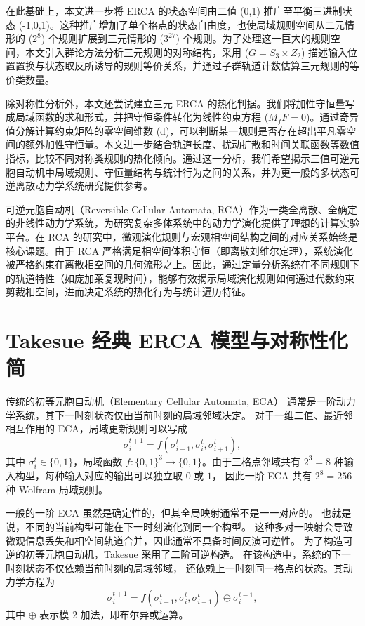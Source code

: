 \documentclass[reprint, amsmath, amssymb, aps, physrev,prb]{revtex4-2}
\begin{document}
在此基础上，本文进一步将 ERCA 的状态空间由二值 ({0,1}) 推广至平衡三进制状态 ({-1,0,1})。这种推广增加了单个格点的状态自由度，也使局域规则空间从二元情形的 ($2^8$) 个规则扩展到三元情形的 ($3^{27}$) 个规则。为了处理这一巨大的规则空间，本文引入群论方法分析三元规则的对称结构，采用 ($G=S_3\times Z_2$) 描述输入位置置换与状态取反所诱导的规则等价关系，并通过子群轨道计数估算三元规则的等价类数量。

除对称性分析外，本文还尝试建立三元 ERCA 的热化判据。我们将加性守恒量写成局域函数的求和形式，并把守恒条件转化为线性约束方程 ($M_fF=0$)。通过奇异值分解计算约束矩阵的零空间维数 (d)，可以判断某一规则是否存在超出平凡零空间的额外加性守恒量。本文进一步结合轨道长度、扰动扩散和时间关联函数等数值指标，比较不同对称类规则的热化倾向。通过这一分析，我们希望揭示三值可逆元胞自动机中局域规则、守恒量结构与统计行为之间的关系，并为更一般的多状态可逆离散动力学系统研究提供参考。

可逆元胞自动机（Reversible Cellular Automata, RCA）作为一类全离散、全确定的非线性动力学系统，为研究复杂多体系统中的动力学演化提供了理想的计算实验平台。在 RCA 的研究中，微观演化规则与宏观相空间结构之间的对应关系始终是核心课题。由于 RCA 严格满足相空间体积守恒（即离散刘维尔定理），系统演化被严格约束在离散相空间的几何流形之上。因此，通过定量分析系统在不同规则下的轨道特性（如庞加莱复现时间），能够有效揭示局域演化规则如何通过代数约束剪裁相空间，进而决定系统的热化行为与统计遍历特征。


\section{Takesue 经典 ERCA 模型与对称性化简}


传统的初等元胞自动机（Elementary Cellular Automata, ECA）
通常是一阶动力学系统，其下一时刻状态仅由当前时刻的局域邻域决定。
对于一维二值、最近邻相互作用的 ECA，局域更新规则可以写成
\[
    \sigma_i^{t+1}
    =
    f(\sigma_{i-1}^{t},\sigma_i^{t},\sigma_{i+1}^{t}),
\]
其中 $\sigma_i^t\in\{0,1\}$，局域函数
$f:\{0,1\}^3\rightarrow\{0,1\}$。由于三格点邻域共有
$2^3=8$ 种输入构型，每种输入对应的输出可以独立取 $0$ 或 $1$，
因此一阶 ECA 共有 $2^8=256$ 种 Wolfram 局域规则。

一般的一阶 ECA 虽然是确定性的，但其全局映射通常不是一一对应的。
也就是说，不同的当前构型可能在下一时刻演化到同一个构型。
这种多对一映射会导致微观信息丢失和相空间轨道合并，因此通常不具备时间反演可逆性。
为了构造可逆的初等元胞自动机，Takesue \cite{shinjin}采用了二阶可逆构造\cite{VICHNIAC198496}。
在该构造中，系统的下一时刻状态不仅依赖当前时刻的局域邻域，
还依赖上一时刻同一格点的状态。其动力学方程为
\begin{equation}
    \sigma_i^{t+1}
    =
    f(\sigma_{i-1}^{t},\sigma_i^{t},\sigma_{i+1}^{t})
    \oplus
    \sigma_i^{t-1},
    \label{eq:binary_erca_update}
\end{equation}
其中 $\oplus$ 表示模 $2$ 加法，即布尔异或运算。
\end{document}

